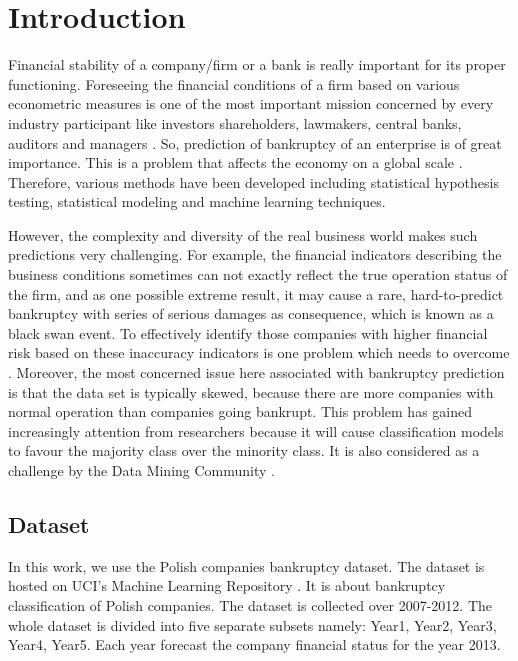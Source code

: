 \section{Introduction}

Financial stability of a company/firm or a bank is really important for its proper functioning. Foreseeing the financial conditions of a firm based on various econometric measures is one of the most important mission concerned by every industry participant like investors shareholders, lawmakers, central banks, auditors and managers \cite{NNModel}. So, prediction of bankruptcy of an enterprise is of great importance. This is a problem that affects the economy on a global scale \cite{zhang2013rule}. Therefore, various methods have been developed including statistical hypothesis testing, statistical modeling and machine learning techniques. 

However, the complexity and diversity of the real business world makes such predictions very challenging. For example, the financial indicators describing the business conditions sometimes can not exactly reflect the true operation status of the firm, and as one possible extreme result, it may cause a rare, hard-to-predict bankruptcy with series of serious damages as consequence, which is known as a black swan event. To effectively identify those companies with higher financial risk based on these inaccuracy indicators is one problem which needs to overcome \cite{altman2010corporate}.  Moreover, the most concerned issue here associated with bankruptcy prediction is that the data set is typically skewed, because there are more companies with normal operation than companies going bankrupt. This problem has gained increasingly attention from researchers because it will cause classification models to favour the majority class over the minority class. It is also considered as a challenge by the Data Mining Community \cite{yang200610}.

\subsection{Dataset}\label{subsec:dataset}

In this work, we use the Polish companies bankruptcy dataset. The dataset is hosted on UCI’s Machine Learning Repository \cite{data}. It is about bankruptcy classification of Polish companies. The dataset is collected over 2007-2012. The whole dataset is divided into five separate subsets namely: Year1, Year2, Year3, Year4, Year5. Each year forecast the company financial status for the year 2013.

